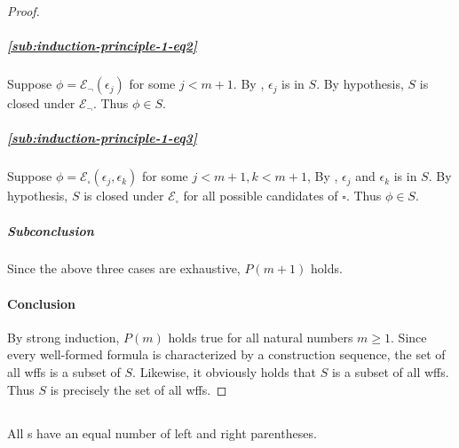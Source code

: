 \documentclass{report}
\begin{document}
\begin{proof}
      \subparagraph{\eqref{sub:induction-principle-1-eq2}}%

        Suppose $\phi = \mathcal{E}_\neg(\epsilon_j)$ for some $j < m + 1$.
        By , $\epsilon_j$ is in $S$.
        By hypothesis, $S$ is closed under $\mathcal{E}_\neg$.
        Thus $\phi \in S$.

      \subparagraph{\eqref{sub:induction-principle-1-eq3}}%

        Suppose $\phi = \mathcal{E}_\square(\epsilon_j, \epsilon_k)$ for some
          $j < m + 1, k < m + 1$,
        By , $\epsilon_j$ and $\epsilon_k$
          is in $S$.
        By hypothesis, $S$ is closed under $\mathcal{E}_\square$ for all
          possible candidates of $\square$.
        Thus $\phi \in S$.

      \subparagraph{Subconclusion}%

        Since the above three cases are exhaustive, $P(m + 1)$ holds.

    \paragraph{Conclusion}%

      By strong induction, $P(m)$ holds true for all natural numbers $m \geq 1$.
      Since every well-formed formula is characterized by a construction
        sequence, the set of all wffs is a subset of $S$.
      Likewise, it obviously holds that $S$ is a subset of all wffs.
      Thus $S$ is precisely the set of all wffs.

  \end{proof}

\subsection{}%

  \begin{lemma}
    All s have an equal number of left and
      right parentheses.
  \end{lemma}
\end{document}
